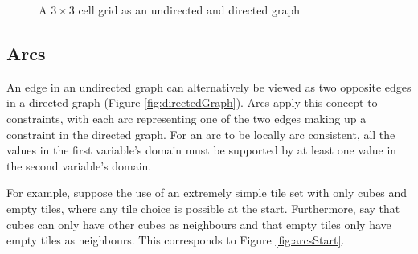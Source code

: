 \begin{figure}[H]
{
        \label{fig:directedGraph}
    }

    \caption{A \(3\times3\) cell grid as an undirected and directed graph}
    \label{fig:graphs}
\end{figure}

\subsection{Arcs}
An edge in an undirected graph can alternatively be viewed as two opposite edges in a directed graph (Figure \ref{fig:directedGraph}). Arcs apply this concept to constraints, with each arc representing one of the two edges making up a constraint in the directed graph. For an arc to be locally arc consistent, all the values in the first variable's domain must be supported by at least one value in the second variable's domain.

For example, suppose the use of an extremely simple tile set with only cubes and empty tiles, where any tile choice is possible at the start. Furthermore, say that cubes can only have other cubes as neighbours and that empty tiles only have empty tiles as neighbours. This corresponds to Figure \ref{fig:arcsStart}.

